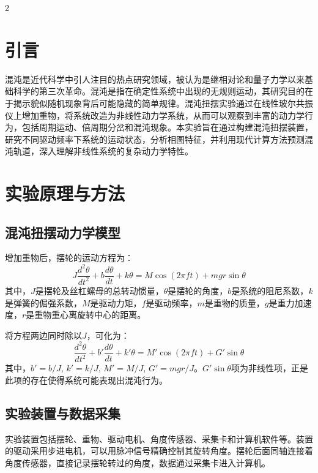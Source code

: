 \documentclass[12pt,a4paper]{article}
\begin{document}
\begin{multicols}{2}

    \section*{\heiti 引言}
    \songti
    \setlength{\parindent}{2em}

    混沌是近代科学中引人注目的热点研究领域，被认为是继相对论和量子力学以来基础科学的第三次革命。混沌是指在确定性系统中出现的无规则运动，其研究目的在于揭示貌似随机现象背后可能隐藏的简单规律。混沌扭摆实验通过在线性玻尔共振仪上增加重物，将系统改造为非线性动力学系统，从而可以观察到丰富的动力学行为，包括周期运动、倍周期分岔和混沌现象。本实验旨在通过构建混沌扭摆装置，研究不同驱动频率下系统的运动状态，分析相图特征，并利用现代计算方法预测混沌轨道，深入理解非线性系统的复杂动力学特性。
    
    \section{\heiti 实验原理与方法}
    \subsection{\heiti 混沌扭摆动力学模型}
    \songti
    增加重物后，摆轮的运动方程为：
    \begin{equation}
        J \frac{d^2 \theta}{dt^2} + b \frac{d \theta}{dt} + k \theta = M \cos(2 \pi f t) + mg r \sin \theta
    \end{equation}
    其中，$J$是摆轮及丝杠螺母的总转动惯量，$\theta$是摆轮的角度，$b$是系统的阻尼系数，$k$是弹簧的倔强系数，$M$是驱动力矩，$f$是驱动频率，$m$是重物的质量，$g$是重力加速度，$r$是重物重心离旋转中心的距离。
    
    将方程两边同时除以$J$，可化为：
    \begin{equation}
        \frac{d^2\theta}{dt^2} + b'\frac{d\theta}{dt} + k'\theta = M' \cos(2\pi ft) + G' \sin \theta
    \end{equation}
    其中，$b'=b/J$, $k'=k/J$, $M'=M/J$, $G'=mgr/J$。$G'\sin\theta$项为非线性项，正是此项的存在使得系统可能表现出混沌行为。

    \subsection{\heiti 实验装置与数据采集}
    
    实验装置包括摆轮、重物、驱动电机、角度传感器、采集卡和计算机软件等。装置的驱动采用步进电机，可以用脉冲信号精确控制其旋转角度。摆轮后面同轴连接着角度传感器，直接记录摆轮转过的角度，数据通过采集卡进入计算机。
    

\end{multicols}
\end{document}
